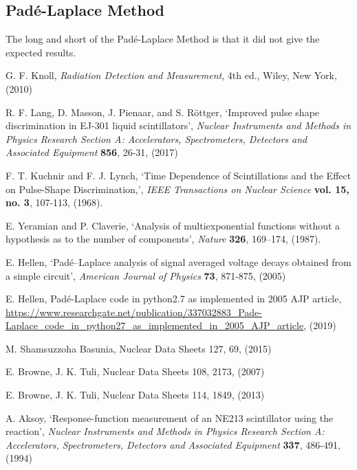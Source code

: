 \documentclass[11pt]{article}
\numberwithin{equation}{section}
\numberwithin{figure}{section}
\numberwithin{table}{section}
\begin{document}
\subsection{Pad\'e-Laplace Method}
\par The long and short of the Pad\'e-Laplace Method is that it did not give the expected results. 




\begin{thebibliography}{9}
    G. F. Knoll, \textit{Radiation Detection and Measurement}, 4th ed., Wiley, New York, (2010)

    R. F. Lang, D. Masson, J. Pienaar, and S. R\"ottger, `Improved pulse shape discrimination in EJ-301 liquid scintillators', \textit{Nuclear Instruments and Methods in Physics Research Section A: Accelerators, Spectrometers, Detectors and Associated Equipment} \textbf{856}, 26-31, (2017)

    F. T. Kuchnir and F. J. Lynch, `Time Dependence of Scintillations and the Effect on Pulse-Shape Discrimination,', \textit{IEEE Transactions on Nuclear Science} \textbf{vol. 15, no. 3}, 107-113, (1968).

    E. Yeramian and P. Claverie, `Analysis of multiexponential functions without a hypothesis as to the number of components', \textit{Nature} \textbf{326}, 169–174, (1987).

    E. Hellen, `Pad\'e–Laplace analysis of signal averaged voltage decays obtained from a simple circuit', \textit{American Journal of Physics} \textbf{73}, 871-875, (2005)
    
    E. Hellen, Pad\'e-Laplace code in python2.7 as implemented in 2005 AJP article, \url{https://www.researchgate.net/publication/337032883_Pade-Laplace_code_in_python27_as_implemented_in_2005_AJP_article}, (2019)

    M. Shamsuzzoha Basunia, Nuclear Data Sheets 127, 69, (2015)
    
    E. Browne, J. K. Tuli, Nuclear Data Sheets 108, 2173, (2007)
    
    E. Browne, J. K. Tuli, Nuclear Data Sheets 114, 1849, (2013)

    A. Aksoy, `Response-function measurement of an NE213 scintillator using the  reaction', \textit{Nuclear Instruments and Methods in Physics Research Section A: Accelerators, Spectrometers, Detectors and Associated Equipment} \textbf{337}, 486-491, (1994)


\end{thebibliography}
\end{document}
